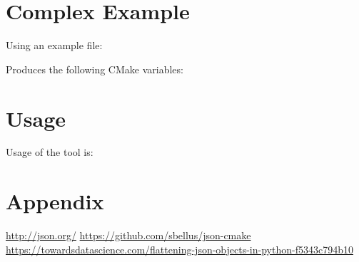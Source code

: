 \documentclass[12pt]{article}
\begin{document}
\section{Complex Example}
Using an example file:

Produces the following CMake variables:

\newpage
\section{Usage}
Usage of the tool is:

\newpage
\appendix
\newpage
\section{Appendix}


\begin{thebibliography}{9}
	 \url{http://json.org/}
 \url{https://github.com/sbellus/json-cmake}
	 \url{https://towardsdatascience.com/flattening-json-objects-in-python-f5343c794b10}
\end{thebibliography}
\end{document}
